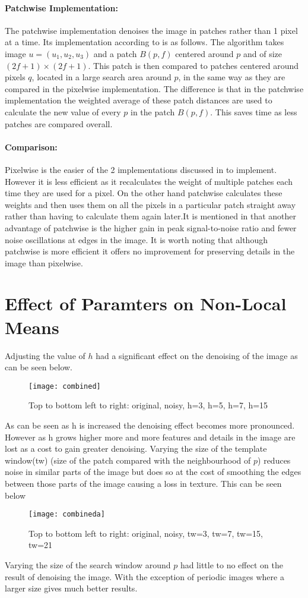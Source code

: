 \documentclass[11pt,letterpaper]{article}
\begin{document}
\paragraph{Patchwise Implementation:}
The patchwise implementation denoises the image in patches rather than 1 pixel at a time. Its implementation according to \cite{paper2} is as follows.
The algorithm takes image $u=(u_{1},u_{2},u_{3})$ and a patch $B(p,f)$ centered around $p$ and of size $\mathit{(2f+1)\times (2f+1)}$. This patch is then compared to patches centered around pixels $q$, located in a large search area around $p$, in the same way as they are compared in the pixelwise implementation. The difference is that in the patchwise implementation the weighted average of these patch distances are used to calculate the new value of every $p$ in the patch $B(p,f)$. This saves time as less patches are compared overall.
\paragraph{Comparison:}
Pixelwise is the easier of the 2 implementations discussed in\cite{paper2} to implement. However it is less efficient as it recalculates the weight of multiple patches each time they are used for a pixel. On the other hand patchwise calculates these weights and then uses them on all the pixels in a particular patch straight away rather than having to calculate them again later.It is mentioned in\cite{paper2} that another advantage of patchwise is the higher gain in peak signal-to-noise ratio and fewer noise oscillations at edges in the image. It is worth noting that although patchwise is more efficient it offers no improvement for preserving details in the image than pixelwise\cite{paper2}. 
\section*{Effect of Paramters on Non-Local Means}
Adjusting the value of $h$ had a significant effect on the denoising of the image as can be seen below.
\begin{figure}[H]
\centering
\texttt{[image: combined]}
\caption{Top to bottom left to right: original, noisy, h=3, h=5, h=7, h=15}
\end{figure}
As can be seen as h is increased the denoising effect becomes more pronounced. However as h grows higher more and more features and details in the image are lost as a cost to gain greater denoising.
Varying the size of the template window(tw) (size of the patch compared with the neighbourhood of $p$) reduces noise in similar parts of the image but does so at the cost of smoothing the edges between those parts of the image causing a loss in texture. This can be seen below
\begin{figure}[H]
\centering
\texttt{[image: combineda]}
\caption{Top to bottom left to right: original, noisy, tw=3, tw=7, tw=15, tw=21}
\end{figure}
Varying the size of the search window around $p$ had little to no effect on the result of denoising the image. With the exception of periodic images where a larger size gives much better results\cite{paper6}.
\end{document}
